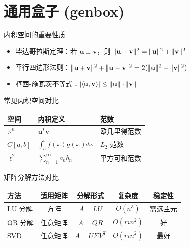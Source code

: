 \section{通用盒子 (genbox)}

\begin{genbox}{内积空间的重要性质}
\begin{itemize}
    \item 毕达哥拉斯定理：若 \( \mathbf{u} \perp \mathbf{v} \)，则 \( \lVert\mathbf{u} + \mathbf{v}\rVert^2 = \lVert\mathbf{u}\rVert^2 + \lVert\mathbf{v}\rVert^2 \)
    \item 平行四边形法则：\( \lVert\mathbf{u} + \mathbf{v}\rVert^2 + \lVert\mathbf{u} - \mathbf{v}\rVert^2 = 2(\lVert\mathbf{u}\rVert^2 + \lVert\mathbf{v}\rVert^2) \)
    \item 柯西-施瓦茨不等式：\( \lvert\langle \mathbf{u}, \mathbf{v} \rangle\rvert \leq \lVert\mathbf{u}\rVert \cdot \lVert\mathbf{v}\rVert \)
\end{itemize}
\end{genbox}

\begin{genbox}{常见内积空间对比}
\begin{tabular}{@{}lll@{}}
\toprule
空间 & 内积定义 & 范数 \\
\midrule
\( \mathbb{R}^n \) & \( \mathbf{u}^T \mathbf{v} \) & 欧几里得范数 \\
\( C[a, b] \) & \( \int_a^b f(x)g(x)dx \) & \( L_2 \) 范数 \\
\( \ell^2 \) & \( \sum_{n=1}^{\infty} a_n \overline{b_n} \) & 平方可和范数 \\
\bottomrule
\end{tabular}
\end{genbox}

\begin{genbox}{矩阵分解方法对比}
\begin{tabular}{@{}lcccc@{}}
\toprule
方法 & 适用矩阵 & 分解形式 & 复杂度 & 稳定性 \\
\midrule
LU 分解 & 方阵 & \( A = LU \) & \( O(n^3) \) & 需选主元 \\
QR 分解 & 任意矩阵 & \( A = QR \) & \( O(mn^2) \) & 好 \\
SVD & 任意矩阵 & \( A = U\Sigma V^T \) & \( O(mn^2) \) & 最好 \\
\bottomrule
\end{tabular}
\end{genbox}